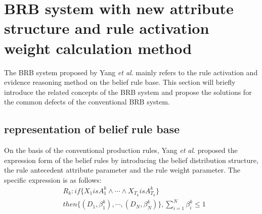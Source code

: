 \documentclass{ieeeaccess}
\begin{document}
\section{BRB system with new attribute structure and rule activation weight calculation method}
The BRB system proposed by Yang \textit{et al}.\cite{a1} mainly refers to the rule activation and evidence reasoning method on the belief rule base. This section will briefly introduce
the related concepts of the BRB system and propose the solutions for the common defects of the conventional BRB system.
\subsection{representation of belief rule base}
On the basis of the conventional production rules, Yang \textit{et al}.\cite{a1} proposed the expression form of the belief rules by introducing the belief distribution structure,
the rule antecedent attribute parameter and the rule weight parameter. The specific expression is as follows:
\begin{equation}
    \begin{split}
        &R_k:if\{X_1isA_1^k \wedge \cdots \wedge X_{T_k}isA_{T_k}^k\} \\
        &then\{(D_1,\beta_1^k),\cdots,(D_N,\beta_N^k)\},\sum_{i=1}^N\beta_i^k\leq1
    \end{split}
\end{equation}
\end{document}
